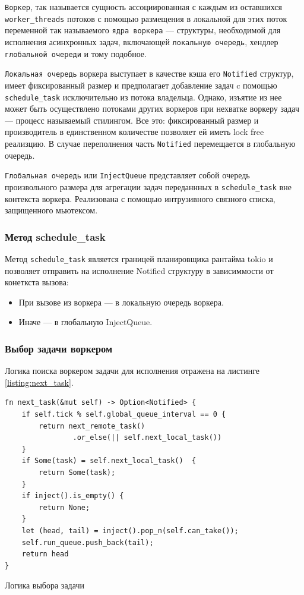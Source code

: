 \verb|Воркер|, так называется сущность ассоциированная с каждым из оставшихся \verb|worker_threads| потоков с помощью размещения в локальной для этих поток переменной так называемого \verb|ядра воркера| --- структуры, необходимой для исполнения асинхронных задач, включающей \verb|локальную очередь|, хендлер \verb|глобальной очереди| и тому подобное.

\verb|Локальная очередь| воркера выступает в качестве кэша его \verb|Notified| структур, имеет фиксированный размер и предполагает добавление задач c помощью \verb|schedule_task| исключительно из потока владельца. Однако, изъятие из нее может быть осуществлено потоками других воркеров при нехватке воркеру задач --- процесс называемый стилингом. Все это: фиксированный размер и производитель в единственном количестве позволяет ей иметь lock free реализцию. В случае переполнения часть \verb|Notified| перемещается в глобальную очередь.

\verb|Глобальная очередь| или \verb|InjectQueue| представляет собой очередь произвольного размера для агрегации задач переданнных в \verb|schedule_task| вне контекста воркера. Реализована с помощью интрузивного связного списка, защищенного мьютексом.

\subsubsection{Метод schedule\_task}

Метод \verb|schedule_task| является границей планировщика рантайма tokio и позволяет отправить на исполнение Notified структуру в зависиммости от конеткста вызова:

\begin{itemize}
    \item При вызове из воркера --- в локальную очередь воркера.
    \item Иначе --- в глобальную InjectQueue.
\end{itemize}

\subsubsection{Выбор задачи воркером}

Логика поиска воркером задачи для исполнения отражена на листинге \ref{listing:next_task}.

\begin{listing}[H]
    \begin{verbatim}
fn next_task(&mut self) -> Option<Notified> {
    if self.tick % self.global_queue_interval == 0 {
        return next_remote_task()
                .or_else(|| self.next_local_task())
    }
    if Some(task) = self.next_local_task()  {
        return Some(task);
    }
    if inject().is_empty() {
        return None;
    }
    let (head, tail) = inject().pop_n(self.can_take());
    self.run_queue.push_back(tail);
    return head
}
    \end{verbatim}

    \caption{Логика выбора задачи}
    \label{listing:next_task}
\end{listing}

